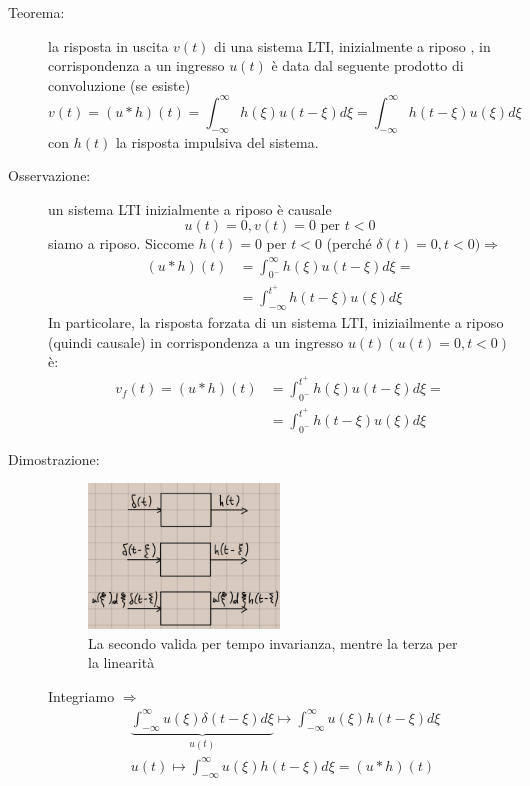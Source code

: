 \documentclass[a4paper, 12pt]{book}
\theoremstyle{plain}
\begin{document}
\begin{description}
    \item[Teorema:] la risposta in uscita $v(t)$ di una sistema LTI, inizialmente a riposo , in corrispondenza a un ingresso $u(t)$ è data dal seguente prodotto di convoluzione (se esiste) \[v(t) = (u \ast h)(t) = \int_{-\infty}^\infty h(\xi)u(t - \xi)d\xi = \int_{-\infty}^\infty h(t - \xi) u(\xi) d\xi\] con $h(t)$ la risposta impulsiva del sistema.
    \item[Osservazione:] un sistema LTI inizialmente a riposo è causale \[u(t) = 0, v(t) = 0 \textrm{ per } t < 0\] siamo a riposo. Siccome $h(t) = 0$ per $t < 0$ (perché $\delta (t) = 0, t < 0) \Rightarrow$ \[\begin{split}
        (u \ast h)(t) &= \int_{0^-}^\infty h(\xi) u(t - \xi) d\xi = \\
        &= \int_{-\infty}^{t^+} h(t- \xi) u(\xi) d\xi
    \end{split} \] In particolare, la risposta forzata di un sistema LTI, iniziailmente a riposo (quindi causale) in corrispondenza a un ingresso $u(t) (u(t) = 0, t<0)$ è: \[ \begin{split}
        v_f(t) = (u \ast h) (t) &= \int_{0^-}^{t^+} h(\xi) u(t - \xi) d\xi = \\
        &= \int_{0^-}^{t^+} h(t - \xi) u(\xi) d\xi
    \end{split}\]
    \item[Dimostrazione:] \begin{figure}
        \includegraphics[width=0.5\textwidth]{tre_sistemi.jpg}
        \caption{La secondo valida per tempo invarianza, mentre la terza per la linearità }
    \end{figure} Integriamo $\Rightarrow$ \[ \begin{split}
        &\underbrace{\int_{-\infty}^\infty u(\xi) \delta(t - \xi) d\xi}_{u(t)} \mapsto \int_{-\infty}^\infty u(\xi) h(t - \xi) d\xi \\
        &u(t) \mapsto \int_{-\infty}^\infty u(\xi) h(t - \xi) d\xi = (u \ast h)(t)

\end{split}\]
\end{description}
\end{document}

